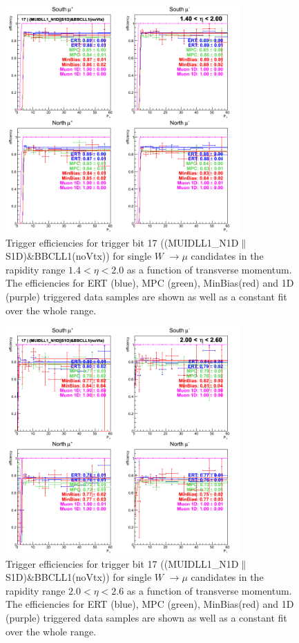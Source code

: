 \begin{figure}[ht]
\begin{center}
\includegraphics[width=0.8\textwidth]{./figures/run13_trigeffipt_eta1_trig17_lin.png}
\caption{\label{fig:run13_trigeffipt_eta1_nper0_trig17_lin} Trigger efficiencies for trigger bit 17 ((MUIDLL1\_N1D$\|$S1D)\&BBCLL1(noVtx)) for single $W$ $\rightarrow \mu$ candidates in the rapidity range $ 1.4 < \eta < 2.0$ as a function of transverse momentum. The efficiencies for ERT (blue), MPC (green), MinBias(red) and 1D (purple) triggered data samples are shown as well as a constant fit over the whole range.}
\end{center}
\end{figure}
\begin{figure}[ht]
\begin{center}
\includegraphics[width=0.8\textwidth]{./figures/run13_trigeffipt_eta2_trig17_lin.png}
\caption{\label{fig:run13_trigeffipt_eta2_nper0_trig17_lin} Trigger efficiencies for trigger bit 17 ((MUIDLL1\_N1D$\|$S1D)\&BBCLL1(noVtx)) for single $W$ $\rightarrow \mu$ candidates in the rapidity range $ 2.0 < \eta < 2.6$ as a function of transverse momentum. The efficiencies for ERT (blue), MPC (green), MinBias(red) and 1D (purple) triggered data samples are shown as well as a constant fit over the whole range.}
\end{center}
\end{figure}
